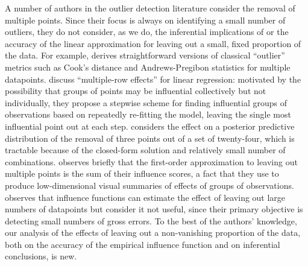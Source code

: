 A number of authors in the outlier detection literature consider the removal of
multiple points.  Since their focus is always on identifying a small number of
outliers, they do not consider, as we do, the inferential implications of or the
accuracy of the linear approximation for leaving out a small, fixed proportion
of the data.  For example, \citet[chapter 5]{hadi:2009:sensitivityinregression}
derives straightforward versions of classical ``outlier'' metrics such as Cook's
distance and Andrews-Pregibon statistics for multiple datapoints. \citet[section
2.1]{belsley:1980:regression} discuss ``multiple-row effects'' for linear
regression: motivated by the possibility that groups of points may be
influential collectively but not individually, they propose a stepwise scheme
for finding influential groups of observations based on repeatedly re-fitting
the model, leaving the single most influential point out at each step.
\citet{johnson:1983:predictiveinfluence} considers the effect on a posterior
predictive distribution of the removal of three points out of a set of
twenty-four, which is tractable because of the closed-form solution and
relatively small number of combinations.  \citet{huh:1990:local} observes
briefly that the first-order approximation to leaving out multiple points is the
sum of their influence scores, a fact that they use to produce low-dimensional
visual summaries of effects of groups of observations.
\citet{taylor:1993:unifiedapproachtoinfluentialdata} observes that influence
functions can estimate the effect of leaving out large numbers of datapoints but
consider it not useful, since their primary objective is detecting small numbers
of gross errors. To the best of the authors' knowledge, our analysis of the
effects of leaving out a non-vanishing proportion of the data, both on the
accuracy of the empirical influence function and on inferential conclusions, is
new.

